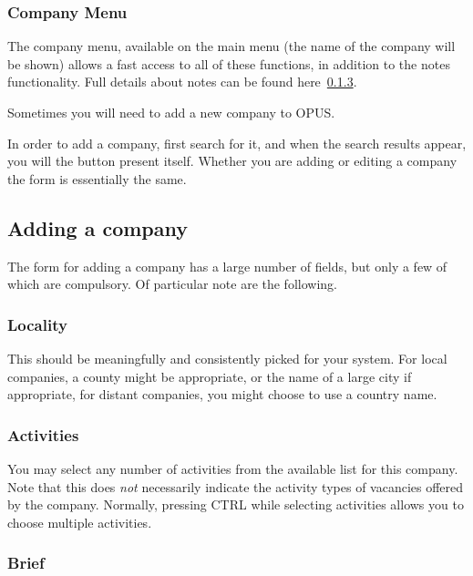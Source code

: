 \documentclass[12 pt]{book}
\begin{document}
\subsubsection{Company Menu}

The company menu, available on the main menu (the name of the company will be
shown) allows a fast access to all of these functions, in addition to the notes
functionality. Full details about notes can be found here~\ref{}.

Sometimes you will need to add a new company to OPUS.


In order to add a company, first search for it, and when the search results
appear, you will the  button present itself. Whether you are 
adding or editing a company the form is essentially the same.

\subsection{Adding a company}

The form for adding a company has a large number of fields, but only a few of
which are compulsory. Of particular note are the following.

\subsubsection{Locality}

This should be meaningfully and consistently picked for your system. For
local companies, a county might be appropriate, or the name of a large city
if appropriate, for distant companies, you might choose to use a country name.

\subsubsection{Activities}

You may select any number of activities from the available list for this
company. Note that this does \emph{not} necessarily indicate the activity 
types of vacancies offered by the company. Normally, pressing CTRL while
selecting activities allows you to choose multiple activities.

\subsubsection{Brief}
\end{document}
